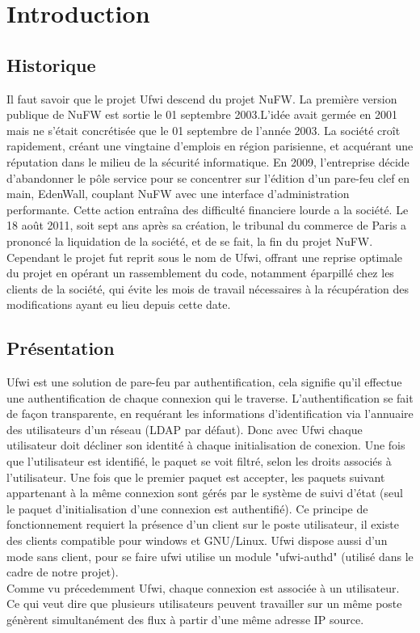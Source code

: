 \documentclass[12pt]{report}
\begin{document}
\newpage

\chapter{Introduction}
\section{Historique}
Il faut savoir que le projet Ufwi descend du projet NuFW.
La première version publique de NuFW est sortie le 01 septembre 2003.L’idée avait germée en 2001 mais ne s’était concrétisée que le 01 septembre de l’année 2003.
La société croît rapidement, créant une vingtaine d'emplois en région parisienne, et acquérant une réputation dans le milieu de la sécurité informatique. 
En 2009, l'entreprise décide d'abandonner le pôle service pour se concentrer sur l'édition d'un pare-feu clef en main, EdenWall, couplant NuFW avec une interface d'administration performante.
Cette action entraîna des difficulté financiere lourde a la société.
Le 18 août 2011, soit sept ans après sa création, le tribunal du commerce de Paris a prononcé la liquidation de la société, et de se fait, la fin du projet NuFW.\\
Cependant le projet fut reprit sous le nom de Ufwi, offrant une reprise optimale du projet en opérant un rassemblement du code,
 notamment éparpillé chez les clients de la société, qui évite les mois de travail nécessaires à la récupération des modifications ayant eu lieu depuis cette date.
\section{Présentation}
Ufwi est une solution de pare-feu par authentification, cela signifie qu'il effectue une authentification de chaque connexion qui le traverse.
 L'authentification se fait de façon transparente, en requérant les informations d’identification via l'annuaire des utilisateurs d'un réseau (LDAP par défaut).
 Donc avec Ufwi chaque utilisateur doit décliner son identité à chaque initialisation de conexion. Une fois que l'utilisateur est identifié,
 le paquet se voit filtré, selon les droits associés à l'utilisateur.
 Une fois que le premier paquet est accepter, les paquets suivant appartenant à la même connexion sont gérés par le système de suivi d'état
 (seul le paquet d'initialisation d'une connexion est authentifié). Ce principe de fonctionnement requiert la présence d'un client sur le poste utilisateur, il existe des clients compatible pour windows et GNU/Linux.
Ufwi dispose aussi d'un mode sans client, pour se faire ufwi utilise un module "ufwi-authd" (utilisé dans le cadre de notre projet).\\
Comme vu précedemment Ufwi, chaque connexion est associée à un utilisateur. Ce qui veut dire que plusieurs utilisateurs peuvent travailler sur un même poste génèrent simultanément des flux à partir d'une même adresse IP source.
\end{document}
